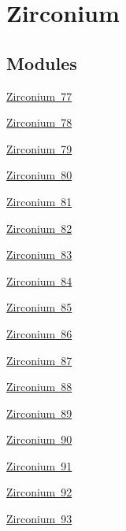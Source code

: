 \hypertarget{group___isotope_const-_zirconium}{}\section{Zirconium}
\label{group___isotope_const-_zirconium}
\subsection*{Modules}
\begin{DoxyCompactItemize}
\item 
\mbox{\hyperlink{group___isotope_const-_zirconium-_zr77}{Zirconium 77}}
\item 
\mbox{\hyperlink{group___isotope_const-_zirconium-_zr78}{Zirconium 78}}
\item 
\mbox{\hyperlink{group___isotope_const-_zirconium-_zr79}{Zirconium 79}}
\item 
\mbox{\hyperlink{group___isotope_const-_zirconium-_zr80}{Zirconium 80}}
\item 
\mbox{\hyperlink{group___isotope_const-_zirconium-_zr81}{Zirconium 81}}
\item 
\mbox{\hyperlink{group___isotope_const-_zirconium-_zr82}{Zirconium 82}}
\item 
\mbox{\hyperlink{group___isotope_const-_zirconium-_zr83}{Zirconium 83}}
\item 
\mbox{\hyperlink{group___isotope_const-_zirconium-_zr84}{Zirconium 84}}
\item 
\mbox{\hyperlink{group___isotope_const-_zirconium-_zr85}{Zirconium 85}}
\item 
\mbox{\hyperlink{group___isotope_const-_zirconium-_zr86}{Zirconium 86}}
\item 
\mbox{\hyperlink{group___isotope_const-_zirconium-_zr87}{Zirconium 87}}
\item 
\mbox{\hyperlink{group___isotope_const-_zirconium-_zr88}{Zirconium 88}}
\item 
\mbox{\hyperlink{group___isotope_const-_zirconium-_zr89}{Zirconium 89}}
\item 
\mbox{\hyperlink{group___isotope_const-_zirconium-_zr90}{Zirconium 90}}
\item 
\mbox{\hyperlink{group___isotope_const-_zirconium-_zr91}{Zirconium 91}}
\item 
\mbox{\hyperlink{group___isotope_const-_zirconium-_zr92}{Zirconium 92}}
\item 
\mbox{\hyperlink{group___isotope_const-_zirconium-_zr93}{Zirconium 93}}
\item 

\end{DoxyCompactItemize}
